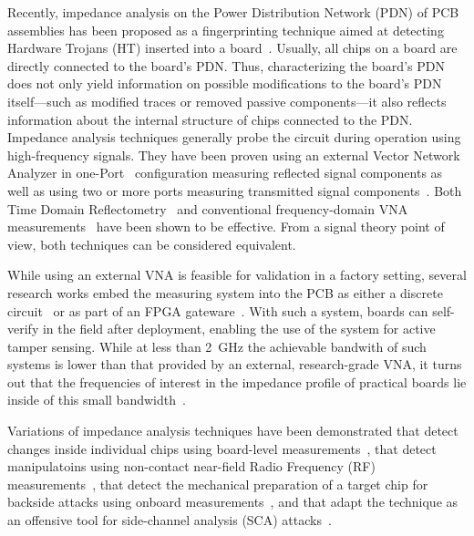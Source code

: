 \documentclass[final]{iacrtrans}
\begin{document}
Recently, impedance analysis on the Power Distribution Network (PDN) of PCB assemblies has been proposed as a
fingerprinting technique aimed at detecting Hardware Trojans (HT) inserted into a board~\cite{
    fujimotoDemonstrationHTDetectionMethod2018,
    mosavirikImpedanceVerifOnChipImpedance2022}.
Usually, all chips on a board are directly connected to the board's PDN. Thus, characterizing the board's PDN does not
only yield information on possible modifications to the board's PDN itself---such as modified traces or removed passive
components---it also reflects information about the internal structure of chips connected to the PDN. Impedance analysis
techniques generally probe the circuit during operation using high-frequency signals. They have been proven using an
external Vector Network Analyzer in one-Port~\cite{mosavirikSiliconEchoesNonInvasive2023} configuration measuring
reflected signal components as well as using two or more ports measuring transmitted signal
components~\cite{zhuPDNPulseSensingPCB2023}. Both Time Domain
Reflectometry~\cite{fujimotoDemonstrationHTDetectionMethod2018} and conventional frequency-domain VNA
measurements~\cite{mosavirikImpedanceVerifOnChipImpedance2022} have been shown to be effective. From a signal theory
point of view, both techniques can be considered equivalent.

While using an external VNA is feasible for validation in a factory setting, several research works embed the measuring
system into the PCB as either a discrete circuit~\cite{fujimotoDemonstrationHTDetectionMethod2018} or as part of an FPGA
gateware~\cite{
    mosavirikImpedanceVerifOnChipImpedance2022,
    mosavirikBackMonICBackside2024}.
With such a system, boards can self-verify in the field after deployment, enabling the use of the system for active
tamper sensing. While at less than \qty{2}{\giga\hertz} the achievable bandwith of such systems is lower than that
provided by an external, research-grade VNA, it turns out that the frequencies of interest in the impedance profile of
practical boards lie inside of this small bandwidth~\cite{mosavirikImpedanceVerifOnChipImpedance2022}.

Variations of impedance analysis techniques have been demonstrated that detect changes inside individual chips using
board-level measurements~\cite{luCorrelatedRandomnessTeleportation2021}, that detect manipulatoins using non-contact
near-field Radio Frequency (RF) measurements~\cite{saadatsafaNearFieldMicrowaveSensing2025}, that detect the mechanical
preparation of a target chip for backside attacks using onboard measurements~\cite{mosavirikBackMonICBackside2024}, and
that adapt the technique as an offensive tool for side-channel analysis (SCA)
attacks~\cite{monfaredLeakyOhmSecretBits2023}.
\end{document}
